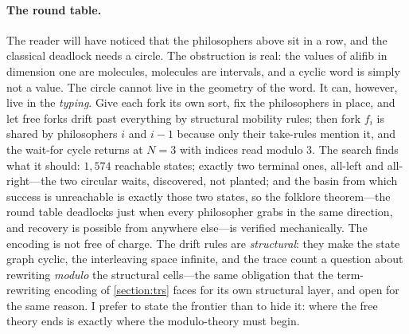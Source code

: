 \paragraph{The round table.}
The reader will have noticed that the philosophers above sit in a row,
and the classical deadlock needs a circle. The obstruction is real: the
values of alifib in dimension one are molecules, molecules are
intervals, and a cyclic word is simply not a value. The circle cannot
live in the geometry of the word. It can, however, live in the
\emph{typing}. Give each fork its own sort, fix the philosophers in
place, and let free forks drift past everything by structural mobility
rules; then fork $f_i$ is shared by philosophers $i$ and $i-1$ because
only their take-rules mention it, and the wait-for cycle returns at
$N=3$ with indices read modulo $3$. The search finds what it should:
$1{,}574$ reachable states; exactly two terminal ones, all-left and
all-right---the two circular waits, discovered, not planted; and the
basin from which success is unreachable is exactly those two states, so
the folklore theorem---the round table deadlocks just when every
philosopher grabs in the same direction, and recovery is possible from
anywhere else---is verified mechanically. The encoding is not free of
charge. The drift rules are \emph{structural}: they make the state
graph cyclic, the interleaving space infinite, and the trace count a
question about rewriting \emph{modulo} the structural cells---the same
obligation that the term-rewriting encoding of \cref{section:trs} faces
for its own structural layer, and open for the same reason. I prefer to
state the frontier than to hide it: where the free theory ends is
exactly where the modulo-theory must begin.

